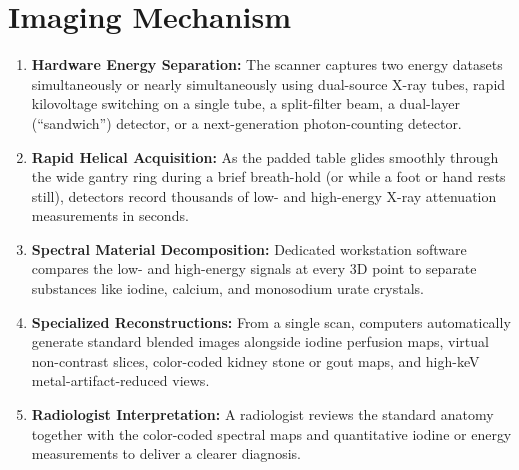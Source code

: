 \section{Imaging Mechanism}
\begin{enumerate}
\item \textbf{Hardware Energy Separation:} The scanner captures two energy datasets simultaneously or nearly simultaneously using dual-source X-ray tubes, rapid kilovoltage switching on a single tube, a split-filter beam, a dual-layer (``sandwich'') detector, or a next-generation photon-counting detector.
\item \textbf{Rapid Helical Acquisition:} As the padded table glides smoothly through the wide gantry ring during a brief breath-hold (or while a foot or hand rests still), detectors record thousands of low- and high-energy X-ray attenuation measurements in seconds.
\item \textbf{Spectral Material Decomposition:} Dedicated workstation software compares the low- and high-energy signals at every 3D point to separate substances like iodine, calcium, and monosodium urate crystals.
\item \textbf{Specialized Reconstructions:} From a single scan, computers automatically generate standard blended images alongside iodine perfusion maps, virtual non-contrast slices, color-coded kidney stone or gout maps, and high-keV metal-artifact-reduced views.
\item \textbf{Radiologist Interpretation:} A radiologist reviews the standard anatomy together with the color-coded spectral maps and quantitative iodine or energy measurements to deliver a clearer diagnosis.
\end{enumerate}

